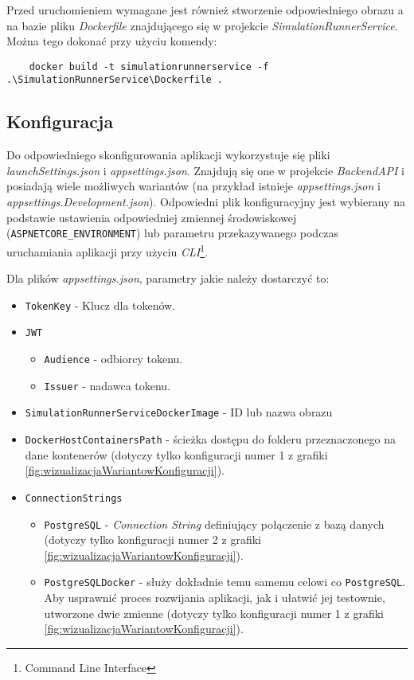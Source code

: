 \par Przed uruchomieniem wymagane jest również stworzenie odpowiedniego obrazu \emph{\docker{}}a na bazie pliku \emph{Dockerfile} znajdującego się w projekcie \emph{SimulationRunnerService}. Można tego dokonać przy użyciu komendy:

\begin{lstlisting}
	docker build -t simulationrunnerservice -f .\SimulationRunnerService\Dockerfile .
\end{lstlisting}

\subsection{Konfiguracja}
\label{subsec:konfiguracja}

\par Do odpowiedniego skonfigurowania aplikacji wykorzystuje się pliki \emph{launchSettings.json} i \emph{appsettings.json}. Znajdują się one w projekcie \emph{BackendAPI} i posiadają wiele możliwych wariantów (na przykład istnieje \emph{appsettings.json} i \emph{appsettings.Development.json}). Odpowiedni plik konfiguracyjny jest wybierany na podstawie ustawienia odpowiedniej zmiennej środowiskowej (\texttt{ASPNETCORE\_ENVIRONMENT}) lub parametru przekazywanego podczas uruchamiania aplikacji przy użyciu \emph{\dotnet{}} \emph{CLI}\footnote{Command Line Interface}.

\newcommand{\onlyConfiguration}[1]{(dotyczy tylko konfiguracji numer #1 z grafiki \ref{fig:wizualizacjaWariantowKonfiguracji})}

\par Dla plików \emph{appsettings.json}, parametry jakie należy dostarczyć to:
\begin{itemize}
	\item \texttt{TokenKey} - Klucz dla tokenów.
	\item \texttt{JWT}
	\begin{itemize}
		\item \texttt{Audience} - odbiorcy tokenu.
		\item \texttt{Issuer} - nadawca tokenu.
	\end{itemize}
	\item \texttt{SimulationRunnerServiceDockerImage} - ID lub nazwa obrazu \emph{\docker{}}
	\item \texttt{DockerHostContainersPath} - ścieżka dostępu do folderu przeznaczonego na dane kontenerów \onlyConfiguration{1}.
	\item \texttt{ConnectionStrings}
	\begin{itemize}
		\item \texttt{PostgreSQL} - \emph{Connection String} definiujący połączenie z bazą danych \onlyConfiguration{2}.
		\item \texttt{PostgreSQLDocker} - służy dokładnie temu samemu celowi co \texttt{PostgreSQL}. Aby usprawnić proces rozwijania aplikacji, jak i ułatwić jej testownie, utworzone dwie zmienne \onlyConfiguration{1}.
	\end{itemize}
\end{itemize}

